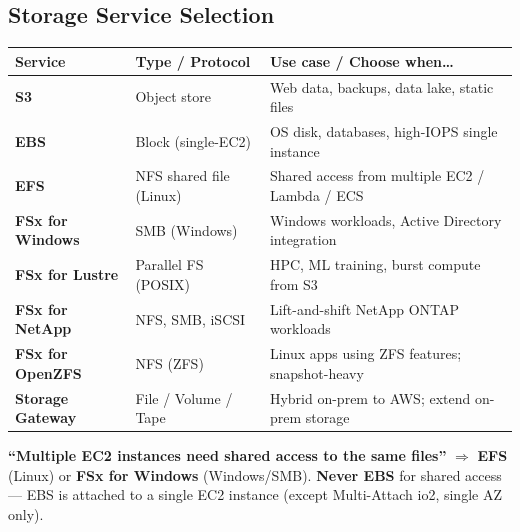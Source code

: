 

\subsection{Storage Service Selection}

\begin{comparebox}[title={AWS storage service comparison}]
\begin{tabular}{@{}p{3.5cm}p{3.5cm}p{4.5cm}@{}}
\toprule
\textbf{Service} & \textbf{Type / Protocol} & \textbf{Use case / Choose when\ldots} \\
\midrule
\textbf{S3}               & Object store & Web data, backups, data lake, static files \\[3pt]
\textbf{EBS}              & Block (single-EC2) & OS disk, databases, high-IOPS single instance \\[3pt]
\textbf{EFS}              & NFS shared file (Linux) & Shared access from multiple EC2 / Lambda / ECS \\[3pt]
\textbf{FSx for Windows}  & SMB (Windows) & Windows workloads, Active Directory integration \\[3pt]
\textbf{FSx for Lustre}   & Parallel FS (POSIX) & HPC, ML training, burst compute from S3 \\[3pt]
\textbf{FSx for NetApp}   & NFS, SMB, iSCSI & Lift-and-shift NetApp ONTAP workloads \\[3pt]
\textbf{FSx for OpenZFS}  & NFS (ZFS) & Linux apps using ZFS features; snapshot-heavy \\[3pt]
\textbf{Storage Gateway}  & File / Volume / Tape & Hybrid on-prem to AWS; extend on-prem storage \\
\bottomrule
\end{tabular}
\end{comparebox}

\begin{examtip}
\textbf{``Multiple EC2 instances need shared access to the same files''} $\Rightarrow$ \textbf{EFS} (Linux) or \textbf{FSx for Windows} (Windows/SMB).
\textbf{Never EBS} for shared access --- EBS is attached to a single EC2 instance (except Multi-Attach io2, single AZ only).
\end{examtip}

